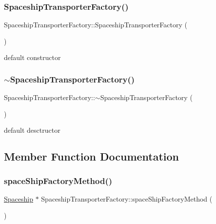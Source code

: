 \subsubsection{\texorpdfstring{Spaceship\+Transporter\+Factory()}{SpaceshipTransporterFactory()}}
{\footnotesize\ttfamily Spaceship\+Transporter\+Factory\+::\+Spaceship\+Transporter\+Factory (\begin{DoxyParamCaption}{ }\end{DoxyParamCaption})}

default constructor \mbox{\label{classSpaceshipTransporterFactory_ae212a0156eeb4517bc8e8f518971eec7}} 
\subsubsection{\texorpdfstring{$\sim$\+Spaceship\+Transporter\+Factory()}{~SpaceshipTransporterFactory()}}
{\footnotesize\ttfamily Spaceship\+Transporter\+Factory\+::$\sim$\+Spaceship\+Transporter\+Factory (\begin{DoxyParamCaption}{ }\end{DoxyParamCaption})}

default desctructor 

\subsection{Member Function Documentation}
\mbox{\label{classSpaceshipTransporterFactory_a284f810807dd8ba597ed110b2c72f084}} 
\subsubsection{\texorpdfstring{space\+Ship\+Factory\+Method()}{spaceShipFactoryMethod()}}
{\footnotesize\ttfamily \hyperlink{classSpaceship}{Spaceship} $\ast$ Spaceship\+Transporter\+Factory\+::space\+Ship\+Factory\+Method (\begin{DoxyParamCaption}{ }\end{DoxyParamCaption})\hspace{0.3cm}{\ttfamily [virtual]}}

